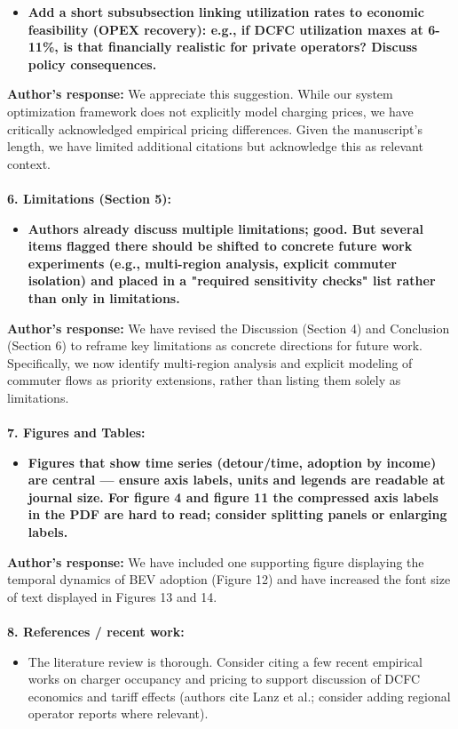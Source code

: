 \documentclass[11pt]{article}
\begin{document}
\color{reviewergrey}
\begin{itemize}
    \item[o]\textbf{Add a short subsubsection linking utilization rates to economic feasibility (OPEX recovery): e.g., if DCFC utilization maxes at 6-11\%, is that financially realistic for private operators? Discuss policy consequences.}
\end{itemize}
\color{authorblue}
\noindent \textcolor{authorblue}{\textbf{Author's response:}} We appreciate this suggestion. While our system optimization framework does not explicitly model charging prices, we have critically acknowledged empirical pricing differences. Given the manuscript's length, we have limited additional citations but acknowledge this as relevant context.\\\\
\color{reviewergrey}\textbf{6. Limitations (Section 5):}
\begin{itemize}
    \item[o]\textbf{ Authors already discuss multiple limitations; good. But several items flagged there should be shifted to concrete future work experiments (e.g., multi-region analysis, explicit commuter isolation) and placed in a "required sensitivity checks" list rather than only in limitations.}
\end{itemize}
\color{authorblue}
\noindent \textcolor{authorblue}{\textbf{Author's response:}}
We have revised the Discussion (Section 4) and Conclusion (Section 6) to reframe key limitations as concrete directions for future work. Specifically, we now identify multi-region analysis and explicit modeling of commuter flows as priority extensions, rather than listing them solely as limitations. \\\\
\color{reviewergrey}
\textbf{7. Figures and Tables:}
\begin{itemize}
    \item[o] \textbf{Figures that show time series (detour/time, adoption by income) are central — ensure axis labels, units and legends are readable at journal size. For figure 4 and figure 11 the compressed axis labels in the PDF are hard to read; consider splitting panels or enlarging labels.}
\end{itemize}
\color{authorblue}
\noindent \textcolor{authorblue}{\textbf{Author's response:}} We have included one supporting figure displaying the temporal dynamics of BEV adoption (Figure 12) and have increased the font size of text displayed in Figures 13 and 14.\\\\ \color{reviewergrey}
\textbf{8. References / recent work:}
\begin{itemize}
    \item[o]The literature review is thorough. Consider citing a few recent empirical works on charger occupancy and pricing to support discussion of DCFC economics and tariff effects (authors cite Lanz et al.; consider adding regional operator reports where relevant). 
\end{itemize}
 
\end{document}
